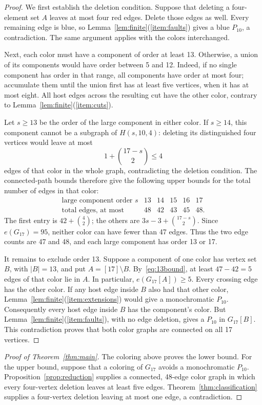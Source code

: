 \documentclass[12pt]{article}
\begin{document}
\begin{proof}
We first establish the deletion condition. Suppose that deleting
a four-element set $A$ leaves at most four red edges. Delete
those edges as well. Every remaining edge is blue, so
Lemma~\ref{lem:finite}(\ref{item:faults}) gives a blue $P_{10}$,
a contradiction. The same argument applies with the colors
interchanged.

Next, each color must have a component of order at least 13.
Otherwise, a union of its components would have order between
5 and 12. Indeed, if no single component has order in that range,
all components have order at most four; accumulate them until
the union first has at least five vertices, when it has at most
eight. All host edges across the resulting cut have the other
color, contrary to Lemma~\ref{lem:finite}(\ref{item:cuts}).

Let $s\geq13$ be the order of the large component in either
color. If $s\geq14$, this component cannot be a subgraph of
$H(s,10,4)$: deleting its distinguished four vertices would
leave at most
\[
 1+\binom{17-s}{2}\leq4
\]
edges of that color in the whole graph, contradicting the
deletion condition. The connected-path bounds therefore give
the following upper bounds for the total number of edges in
that color:
\[
\begin{array}{c|rrrrr}
 \text{large component order }s&13&14&15&16&17\\ \hline
 \text{total edges, at most}&48&42&43&45&48.
\end{array}
\]
The first entry is $42+\binom42$; the others are
$3s-3+\binom{17-s}{2}$. Since $e(G_{17})=95$, neither
color can have fewer than 47 edges. Thus the two edge counts
are 47 and 48, and each large component has order 13 or 17.

It remains to exclude order 13. Suppose a component of one
color has vertex set $B$, with $|B|=13$, and put
$A=[17]\setminus B$. By~\eqref{eq:13bound}, at least
$47-42=5$ edges of that color lie in $A$. In particular,
$e(G_{17}[A])\geq5$. Every crossing edge has the other color.
If any host edge inside $B$ also had that other color,
Lemma~\ref{lem:finite}(\ref{item:extensions}) would give a
monochromatic $P_{10}$. Consequently every host edge inside
$B$ has the component's color. But
Lemma~\ref{lem:finite}(\ref{item:faults}), with no edge
deletion, gives a $P_{10}$ in $G_{17}[B]$.
This contradiction proves that both color graphs are connected
on all 17 vertices.
\end{proof}

\begin{proof}[Proof of Theorem~\ref{thm:main}]
The coloring above proves the lower bound. For the upper bound,
suppose that a coloring of $G_{17}$ avoids a monochromatic
$P_{10}$. Proposition~\ref{prop:reduction} supplies a connected,
48-edge color graph in which every four-vertex deletion leaves
at least five edges. Theorem~\ref{thm:classification} supplies
a four-vertex deletion leaving at most one edge, a contradiction.
\end{proof}
\end{document}
